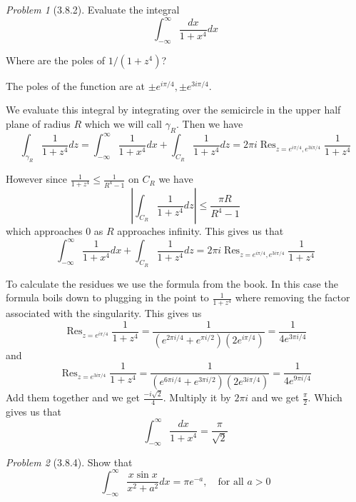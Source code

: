 \documentclass[10pt]{article}
\newcommand{\sk}{\vskip 10mm}
\DeclareMathOperator{\Res}{Res}
\theoremstyle{remark}
\newtheorem{problem}{Problem}
\theoremstyle{remark}
\begin{document}
\sk

\begin{problem}[3.8.2]
  Evaluate the integral
  \[
    \int_{-\infty}^\infty \frac{dx}{1+x^4}dx
  \]

  Where are the poles of $1/\left(1+z^4\right)$?
\end{problem}

The poles of the function are at $\pm e^{i\pi/4},\pm e^{3i\pi/4}$.

We evaluate this integral by integrating over the semicircle in the
upper half plane of radius $R$ which we will call $\gamma_R$. Then we have
\[
  \int_{\gamma_R}\frac{1}{1+z^4} dz = \int_{-\infty}^\infty \frac{1}{1+x^4}dx+\int_{C_R}\frac{1}{1+z^4}dz= 2\pi i\Res_{z=e^{i\pi/4},e^{3i\pi/4}}\frac{1}{1+z^4}
\]

However since $\frac{1}{1+z^4}\leq\frac{1}{R^4-1}$ on $C_R$ we have
\[
  \left|\int_{C_R}\frac{1}{1+z^4}dz\right|\leq\frac{\pi R}{R^4-1}
\]
which approaches $0$ as $R$ approaches infinity. This gives us that
\[
  \int_{-\infty}^\infty \frac{1}{1+x^4}dx+\int_{C_R}\frac{1}{1+z^4}dz= 2\pi i\Res_{z=e^{i\pi/4},e^{3i\pi/4}}\frac{1}{1+z^4}
\]

To calculate the residues we use the formula from the book. In this case the
formula boils down to plugging in the point to $\frac{1}{1+z^4}$ where removing the factor
associated with the singularity. This gives us
\[
  \Res_{z=e^{i\pi/4}}\frac{1}{1+z^4}=\frac{1}{\left(e^{2\pi i/4}+e^{\pi i/2}\right)\left(2e^{i\pi/4}\right)}=\frac{1}{4e^{3\pi i/4}}
\]
and
\[
  \Res_{z=e^{3i\pi/4}}\frac{1}{1+z^4}=\frac{1}{\left(e^{6\pi i/4}+e^{3\pi i/2}\right)\left(2e^{3i\pi/4}\right)}=\frac{1}{4e^{9\pi i/4}}
\]
Add them together and we get $\frac{-i\sqrt{2}}{4}$. Multiply it by $2\pi i$ and
we get $\frac{\pi}{2}$. Which gives us that
\[
  \int_{-\infty}^\infty \frac{dx}{1+x^4} = \frac{\pi}{\sqrt{2}}
\]

\sk

\begin{problem}[3.8.4]
  Show that
  \[
    \int_{-\infty}^\infty\frac{x\sin x}{x^2+a^2}dx=\pi e^{-a},\quad \text{for all $a>0$}
  \]
\end{problem}
\end{document}
